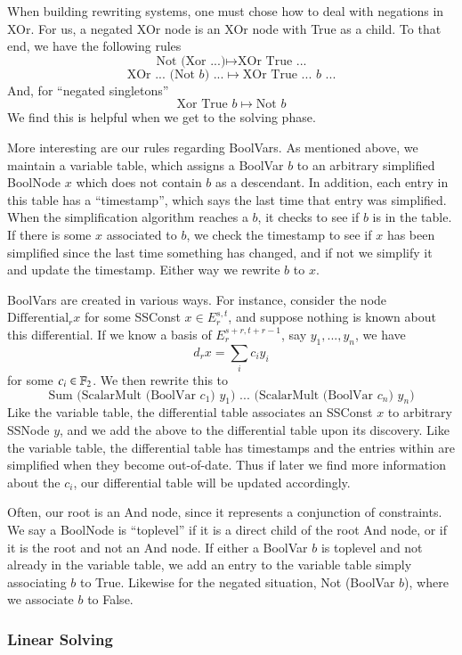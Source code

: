 When building rewriting systems, one must chose how to deal with negations in XOr.
For us, a negated XOr node is an XOr node with True as a child.
To that end, we have the following rules
\[\mbox{Not (Xor ...)} \mapsto \mbox{XOr True ...}\]
\[\mbox{XOr ... (Not $b$) ...} \mapsto\mbox{XOr True ... $b$ ...}\]
And, for ``negated singletons''
\[\mbox{Xor True $b$}\mapsto \mbox{Not $b$}\]
We find this is helpful when we get to the solving phase.  

More interesting are our rules regarding BoolVars.  
As mentioned above, we maintain a variable table, which assigns a BoolVar $b$ to an arbitrary simplified BoolNode $x$ which does not contain $b$ as a descendant.  
In addition, each entry in this table has a ``timestamp'', which says the last time that entry was simplified.  
When the simplification algorithm reaches a $b$, it checks to see if $b$ is in the table.
If there is some $x$ associated to $b$, we check the timestamp to see if $x$ has been simplified since the last time something has changed, and if not we simplify it and update the timestamp.
Either way we rewrite $b$ to $x$.

BoolVars are created in various ways.
For instance, consider the node $\mbox{Differential}_r x$ for some SSConst $x\in E_r^{s,t}$, and suppose nothing is known about this differential.
If we know a basis of $E_r^{s+r,t+r-1}$, say $y_1,...,y_n$, we have
\[d_rx = \sum_i c_iy_i\]
for some $c_i\in \mathbb{F}_2$.  
We then rewrite this to 
\[\mbox{Sum (ScalarMult (BoolVar $c_1$) $y_1$) ... (ScalarMult (BoolVar $c_n$) $y_n$)}\]
Like the variable table, the differential table associates an SSConst $x$ to arbitrary SSNode $y$, and we add the above to the differential table upon its discovery.
Like the variable table, the differential table has timestamps and the entries within are simplified when they become out-of-date.
Thus if later we find more information about the $c_i$, our differential table will be updated accordingly.  

Often, our root is an And node, since it represents a conjunction of constraints.  
We say a BoolNode is ``toplevel'' if it is a direct child of the root And node, or if it is the root and not an And node.
If either a BoolVar $b$ is toplevel and not already in the variable table, we add an entry to the variable table simply associating $b$ to True.
Likewise for the negated situation, Not (BoolVar $b$), where we associate $b$ to False.


\subsubsection{Linear Solving}

